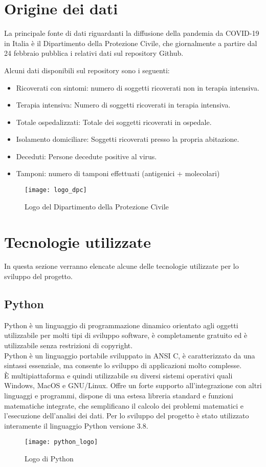 
\section{Origine dei dati}
La principale fonte di dati riguardanti la diffusione della pandemia da COVID-19 in Italia è il Dipartimento della Protezione Civile, che giornalmente a partire dal 24 febbraio pubblica i relativi dati sul repository Github\cite{repository}.

Alcuni dati disponibili sul repository sono i seguenti:
\begin{itemize}
    \item Ricoverati con sintomi: numero di soggetti ricoverati non in terapia intensiva.
    \item Terapia intensiva: Numero di soggetti ricoverati in terapia intensiva.
    \item Totale ospedalizzati: Totale dei soggetti ricoverati in ospedale.
    \item Isolamento domiciliare: Soggetti ricoverati presso la propria abitazione.
    \item Deceduti: Persone decedute positive al virus.
    \item Tamponi: numero di tamponi effettuati (antigenici + molecolari)
\end{itemize}


\begin{figure}[htp]
    \centering
    \texttt{[image: logo\_dpc]}
    \caption{Logo del Dipartimento della Protezione Civile}
\end{figure}


\section{Tecnologie utilizzate}
In questa sezione verranno elencate alcune delle tecnologie utilizzate per lo sviluppo del progetto.

\subsection{Python}
Python è un linguaggio di programmazione dinamico orientato agli oggetti utilizzabile per molti tipi di sviluppo software, è completamente gratuito ed è utilizzabile senza restrizioni di copyright.\\
Python è un linguaggio portabile sviluppato in ANSI C, è caratterizzato da una sintassi essenziale, ma consente lo sviluppo di applicazioni molto complesse.\\
È multipiattaforma e quindi utilizzabile su diversi  sistemi operativi quali Windows, MacOS e GNU/Linux.
Offre un forte supporto all'integrazione con altri linguaggi e programmi, dispone di una estesa libreria standard e funzioni matematiche integrate, che semplificano il calcolo dei problemi matematici e l'esecuzione dell'analisi dei dati.
\noindent Per lo sviluppo del progetto è stato utilizzato interamente il linguaggio Python versione 3.8.
\begin{figure}[htp]
    \centering
    \texttt{[image: python\_logo]}
    \caption{Logo di Python}
\end{figure}


